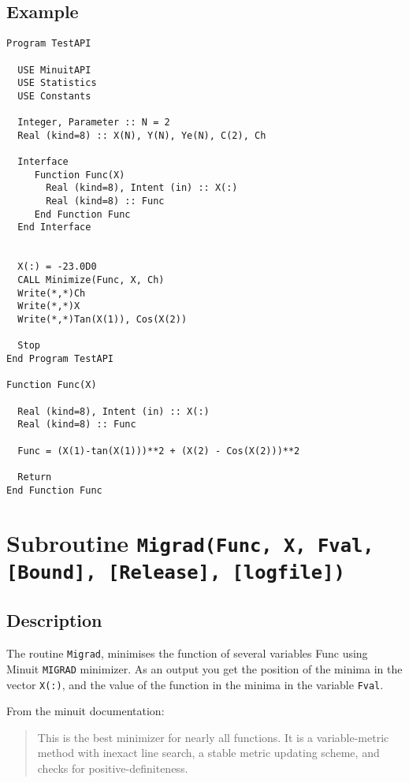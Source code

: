 \subsection{Example}

\begin{lstlisting}[emph=Minimize,
                   emphstyle=\color{blue},
                   frame=trBL,
                   caption=Using minuit library to minimize a function.,
                   label=minimize]
Program TestAPI

  USE MinuitAPI
  USE Statistics
  USE Constants

  Integer, Parameter :: N = 2
  Real (kind=8) :: X(N), Y(N), Ye(N), C(2), Ch

  Interface 
     Function Func(X)
       Real (kind=8), Intent (in) :: X(:)
       Real (kind=8) :: Func
     End Function Func
  End Interface
  

  X(:) = -23.0D0
  CALL Minimize(Func, X, Ch)
  Write(*,*)Ch
  Write(*,*)X
  Write(*,*)Tan(X(1)), Cos(X(2))

  Stop
End Program TestAPI

Function Func(X)

  Real (kind=8), Intent (in) :: X(:)
  Real (kind=8) :: Func

  Func = (X(1)-tan(X(1)))**2 + (X(2) - Cos(X(2)))**2

  Return
End Function Func
\end{lstlisting}

\section{Subroutine \texttt{Migrad(Func, X, Fval, [Bound], [Release], [logfile]) }}

\subsection{Description}

The routine \texttt{Migrad}, minimises the function of several
variables Func using Minuit \texttt{MIGRAD} minimizer. As an output
you get the position of the minima in the 
vector \texttt{X(:)}, and the value of the function in the minima in
the variable \texttt{Fval}. 

From the minuit documentation:
\begin{quotation}
  This is the best minimizer for nearly all functions. It is a
  variable-metric method with inexact line 
  search, a stable metric updating scheme, and checks for
  positive-definiteness. 
\end{quotation}

